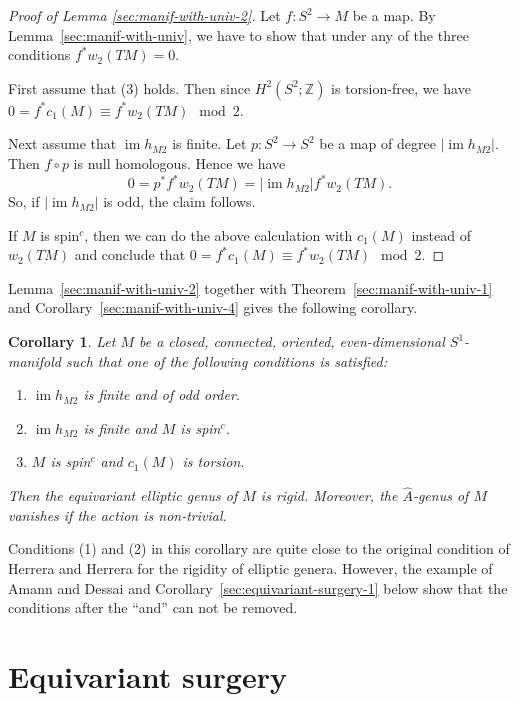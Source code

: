 \documentclass[a4paper, 11pt]{amsart}
\newtheorem{corollary}[theorem]{Corollary}
\theoremstyle{definition}
\theoremstyle{remark}
\numberwithin{equation}{section}
\DeclareMathOperator{\image}{im}
\begin{document}
\begin{proof}[Proof of Lemma \ref{sec:manif-with-univ-2}]
  Let \(f:S^2\rightarrow M\) be a map. By Lemma~\ref{sec:manif-with-univ}, we have to show that under any of the three conditions \(f^*w_2(TM)=0\).
  
  First assume that (3) holds.
  Then since \(H^2(S^2;\mathbb{Z})\) is torsion-free, we have \(0=f^*c_1(M)\equiv f^*w_2(TM) \mod 2\).

  Next assume that \(\image h_{M2}\) is finite. Let \(p:S^2\rightarrow S^2\) be a map of degree \(|\image h_{M2}|\). Then \(f\circ p\) is null homologous. Hence we have
  \[0=p^*f^*w_2(TM)=|\image h_{M2}|f^*w_2(TM).\]
  So, if \(|\image h_{M2}|\) is odd, the claim follows.
  
  If \(M\) is spin$^c$, then we can do the above calculation with \(c_1(M)\) instead of \(w_2(TM)\) and conclude that \(0=f^*c_1(M)\equiv f^*w_2(TM) \mod 2\).
\end{proof}


Lemma~\ref{sec:manif-with-univ-2} together with Theorem~\ref{sec:manif-with-univ-1} and Corollary~\ref{sec:manif-with-univ-4} gives the following corollary.

\begin{corollary}
  \label{sec:manif-with-univ-5}
  Let \(M\) be a closed, connected, oriented, even-dimensional \(S^1\)-manifold such that one of the following conditions is satisfied:
    \begin{enumerate}
  \item \(\image h_{M2}\) is finite and of odd order.
  \item \(\image h_{M2}\) is finite and \(M\) is spin$^c$.
  \item \(M\) is spin$^c$ and \(c_1(M)\) is torsion.
  \end{enumerate}
  Then the equivariant elliptic genus of \(M\) is rigid. Moreover, the \(\hat{A}\)-genus of \(M\) vanishes if the action is non-trivial.
\end{corollary}

Conditions (1) and (2) in this corollary are quite close to the original condition of Herrera and Herrera for the rigidity of elliptic genera. However, the example of Amann and Dessai \cite{MR2600123} and Corollary~\ref{sec:equivariant-surgery-1} below show that the conditions after the ``and'' can not be removed.

\section{Equivariant surgery}
\label{sec:equivariant-surgery}
\end{document}
